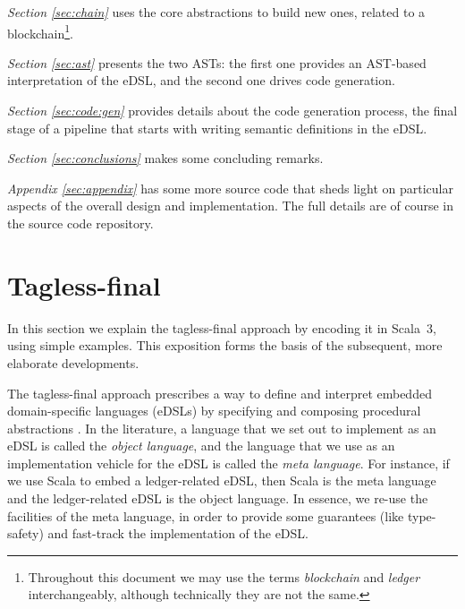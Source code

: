 \documentclass[11pt]{article}
\begin{document}
\textit{Section \ref{sec:chain}} uses the core abstractions to build new ones, related to a blockchain\footnote{Throughout this document we may use the terms \textit{blockchain} and \textit{ledger} interchangeably, although technically they are not the same.}.

\textit{Section \ref{sec:ast}} presents the two ASTs: the first one provides an AST-based interpretation of the eDSL, and the second one drives code generation. 

\textit{Section \ref{sec:code:gen}} provides details about the code generation process, the final stage of a pipeline that starts with writing semantic definitions in the eDSL.

\textit{Section \ref{sec:conclusions} } makes some concluding remarks.

\textit{Appendix \ref{sec:appendix}} has some more source code that sheds light on particular aspects of the overall design and implementation. The full details are of course in the source code repository.

\section{Tagless-final}
\label{sec:tf-primer}
\begin{tcolorbox}
\faAngleDoubleRight{ } In this section we explain the tagless-final approach by encoding it in Scala~3, using simple examples. This exposition forms the basis of the subsequent, more elaborate developments.
\end{tcolorbox}

The tagless-final approach \cite{tf:main:2009,tf:lecture:2012} prescribes a way to define and interpret embedded domain-specific languages (eDSLs) by specifying and composing procedural abstractions \cite{data:abstraction:1978}. In the literature, a language that we set out to implement as an eDSL is called the \textit{object language}, and the language that we use as an implementation vehicle for the eDSL is called the \textit{meta language}. For instance, if we use Scala to embed a ledger-related eDSL, then Scala is the meta language and the ledger-related eDSL is the object language. In essence, we re-use the facilities of the meta language, in order to provide some guarantees (like type-safety) and fast-track the implementation of the eDSL.
\end{document}
